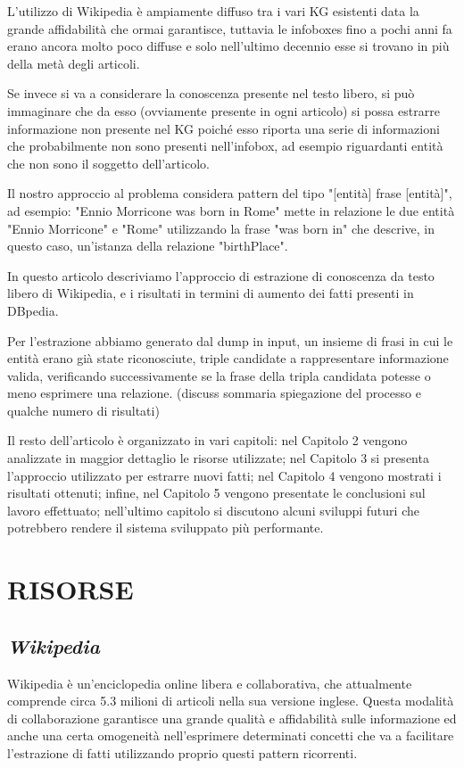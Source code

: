 \documentclass[10pt,a4paper,twocolumn]{article}
\begin{document}
L'utilizzo di Wikipedia è ampiamente diffuso tra i vari KG esistenti data la grande affidabilità che ormai garantisce, tuttavia le infoboxes fino a pochi anni fa erano ancora molto poco diffuse e solo nell'ultimo decennio esse si trovano in più della metà degli articoli.

Se invece si va a considerare la conoscenza presente nel testo libero, si può immaginare che da esso (ovviamente presente in ogni articolo) si possa estrarre informazione non presente nel KG poiché esso riporta una serie di informazioni che probabilmente non sono presenti nell'infobox, ad esempio riguardanti entità che non sono il soggetto dell'articolo.

Il nostro approccio al problema considera pattern del tipo 
"[entità] frase [entità]", ad esempio: "Ennio Morricone was born in Rome" mette in relazione le due entità "Ennio Morricone" e "Rome" utilizzando la frase "was born in" che descrive, in questo caso, un'istanza della relazione "birthPlace".

In questo articolo descriviamo l'approccio di estrazione di conoscenza da testo libero di Wikipedia, e i risultati in termini di aumento dei fatti presenti in DBpedia.

Per l'estrazione abbiamo generato dal dump in input, un insieme di frasi in cui le entità erano già state riconosciute, triple candidate a rappresentare informazione valida, verificando successivamente se la frase della tripla candidata potesse o meno esprimere una relazione.
(discuss sommaria spiegazione del processo e qualche numero di risultati)

Il resto dell'articolo è organizzato in vari capitoli: nel Capitolo 2 vengono analizzate in maggior dettaglio le risorse utilizzate; nel Capitolo 3 si presenta l'approccio utilizzato per estrarre nuovi fatti; nel Capitolo 4 vengono mostrati i risultati ottenuti; infine, nel Capitolo 5 vengono presentate le conclusioni sul lavoro effettuato; nell'ultimo capitolo si discutono alcuni sviluppi futuri che potrebbero rendere il sistema sviluppato più performante.

\section{RISORSE}
\subsection*{\textit{Wikipedia}}

Wikipedia è un'enciclopedia online libera e collaborativa, che attualmente comprende circa 5.3 milioni di articoli nella sua versione inglese. Questa modalità di collaborazione garantisce una grande qualità e affidabilità sulle informazione ed anche una certa omogeneità nell'esprimere determinati concetti che va a facilitare l'estrazione di fatti utilizzando proprio questi pattern ricorrenti.
 
\end{document}
